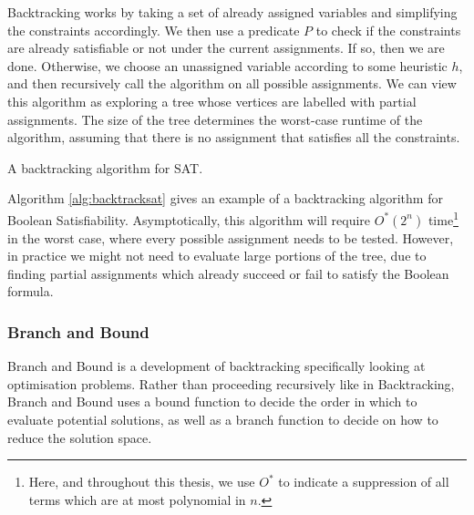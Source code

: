 Backtracking works by taking a set of already assigned variables and simplifying the constraints accordingly. We then use a predicate $P$ to check if the constraints are already satisfiable or not under the current assignments. If so, then we are done. Otherwise, we choose an unassigned variable according to some heuristic $h$, and then recursively call the algorithm on all possible assignments. We can view this algorithm as exploring a tree whose vertices are labelled with partial assignments. The size of the tree determines the worst-case runtime of the algorithm, assuming that there is no assignment that satisfies all the constraints.

\begin{algorithm}
\caption{\label{alg:backtracksat} A backtracking algorithm for SAT.}
\end{algorithm}

Algorithm \ref{alg:backtracksat} gives an example of a backtracking algorithm for Boolean Satisfiability. Asymptotically, this algorithm will require $O^*(2^n)$ time\footnote{Here, and throughout this thesis, we use $O^*$ to indicate a suppression of all terms which are at most polynomial in $n$.} in the worst case, where every possible assignment needs to be tested. However, in practice we might not need to evaluate large portions of the tree, due to finding partial assignments which already succeed or fail to satisfy the Boolean formula.

\subsubsection{Branch and Bound}

Branch and Bound is a development of backtracking specifically looking at optimisation problems. Rather than proceeding recursively like in Backtracking, Branch and Bound uses a bound function to decide the order in which to evaluate potential solutions, as well as a branch function to decide on how to reduce the solution space.

